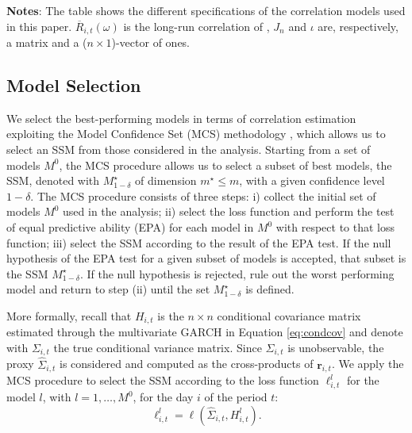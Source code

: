 \begin{table}[htbp]
\begin{threeparttable}
\begin{tabular}{l l@{\hskip .5in}}
            \bottomrule
        \end{tabular}
        \begin{tablenotes}[flushleft]
            \setlength{}
            \small
            \item \textbf{Notes}: The table shows the different specifications of the correlation models used in this paper. $\overline{R}_{i,t}(\omega)$ is the long-run correlation of \cite{Colacito:Engle:Ghysels:2011}, $J_n$ and $\iota$ are, respectively, a matrix and a ($n \times 1$)-vector of ones.
        \end{tablenotes}
    \end{threeparttable}
\end{table}



\subsection{Model Selection}

We select the best-performing models in terms of correlation estimation exploiting the Model Confidence Set (MCS) methodology \citep{Hansen:Lunde:Nason:2003}, which allows us to select an SSM from those considered in the analysis. Starting from a set of models $M^0$, the MCS procedure allows us to select a subset of best models, the SSM, denoted with $M^\star_{1-\delta}$ of dimension $m^\star \leq m$, with a given confidence level $1-\delta$. 
The MCS procedure consists of three steps: i) collect the initial set of models $M^0$ used in the analysis; ii) select the loss function and perform the test of equal predictive ability (EPA) for each model in $M^0$ with respect to that loss function; iii) select the SSM according to the result of the EPA test. If the null hypothesis of the EPA test for a given subset of models is accepted, that subset is the SSM $M^\star_{1-\delta}$. If the null hypothesis is rejected, rule out the worst performing model and  %
return to step (ii) until the set $M^\star_{1-\delta}$ is defined.

More formally, recall that $H_{i,t}$ is the $n \times n$ conditional covariance matrix estimated through the multivariate GARCH in Equation \eqref{eq:condcov} and denote with $\Sigma_{i,t}$ the true conditional variance matrix. Since $\Sigma_{i,t}$ is unobservable, the proxy $\widehat{\Sigma}_{i,t}$ is considered and computed as the cross-products of $\mathbf{r}_{i,t}$. 
We apply the MCS procedure to select the SSM according to the loss function $\ell^{l}_{i,t}$ for the model $l$, with $l=1, \dots, M^0$, for the day $i$ of the period $t$:
\begin{equation}
	\ell^{l}_{i,t}=\ell(\widehat{\Sigma}_{i,t}, H^l_{i,t}).
\end{equation}

